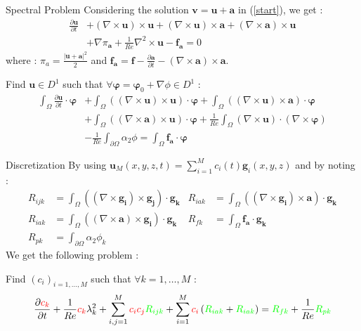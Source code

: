 \documentclass{beamer}
\newcommand{\grad}{{\nabla}}
\newcommand{\curl}{{\nabla\times}}
\newcommand{\curll}{{\nabla^2\times}}
\begin{document}
\begin{frame}{Spectral Problem}
Considering the solution $\mathbf{v}=\mathbf{u}+\mathbf{a}$ in (\ref{start}), we get :
\begin{align*}
\frac{\partial \mathbf{u}}{\partial t} &+ (\curl \mathbf{u})\times \mathbf{u} + (\curl \mathbf{u})\times \mathbf{a} + \left(\curl \mathbf{a}\right)\times \mathbf{u} \\
&+ \grad\pi_\mathbf{a} + \frac{1}{Re}\curll \mathbf{u} - \mathbf{f_a} = 0
\end{align*}
where : $\pi_a=\frac{|\mathbf{u}+\mathbf{a}|^2}{2}$ and $\mathbf{f_a}=\mathbf{f}-\frac{\partial \mathbf{a}}{\partial t}-(\curl\mathbf{a})\times\mathbf{a}$.
\begin{block}{Find $\mathbf{u}\in D^1$ such that $\forall \bm{\varphi}=\bm{\varphi}_0+\grad\phi\in D^1$ :}
\begin{align*}
\int_\Omega \frac{\partial \mathbf{u}}{\partial t}\cdot \bm{\varphi} &+ \int_\Omega ((\curl \mathbf{u})\times \mathbf{u})\cdot \bm{\varphi} + \int_\Omega ((\curl \mathbf{u})\times \mathbf{a})\cdot\bm{\varphi} \\
&+ \int_\Omega ((\curl \mathbf{a})\times \mathbf{u})\cdot\bm{\varphi} + \frac{1}{Re}\int_\Omega (\curl \mathbf{u})\cdot(\curl\bm{\varphi}) \\
&-\frac{1}{Re}\int_{\partial\Omega} \alpha_2\phi = \int_\Omega \mathbf{f_a}\cdot\bm{\varphi}
\end{align*}
\end{block}
\end{frame}

\begin{frame}{Discretization}
By using $\mathbf{u}_M(x,y,z,t)=\sum_{i=1}^M c_i(t)\mathbf{g}_i(x,y,z)$ and by noting :
\begin{align*}
R_{ijk} &= \int_\Omega((\curl\mathbf{g_i})\times \mathbf{g_j})\cdot\mathbf{g_k} & R_{iak} &= \int_\Omega((\curl\mathbf{g_i})\times \mathbf{a})\cdot\mathbf{g_k}\\
R_{iak} &= \int_\Omega((\curl\mathbf{a})\times \mathbf{g_i})\cdot\mathbf{g_k} & R_{fk} &= \int_\Omega\mathbf{f_a}\cdot\mathbf{g_k}\\
R_{pk} &= \int_{\partial\Omega} \alpha_2\phi_k
\end{align*}
We get the following problem :
\begin{block}{Find $(c_i)_{i=1,\dots,M}$ such that $\forall k=1,\dots,M$ :}
\[ \frac{\partial {\color{red}c_k}}{\partial t} + \frac{1}{Re}{\color{red}c_k}\lambda_k^2 + \sum_{i,j=1}^M{\color{red}c_ic_j}{\color{green}R_{ijk}} + \sum_{i=1}^M{\color{red}c_i}\left({\color{green}R_{iak}} + {\color{green}R_{iak}}\right) = {\color{green}R_{fk}} + \frac{1}{Re}{\color{green}R_{pk}} \]
\end{block}
\end{frame}
\end{document}

